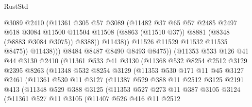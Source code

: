 \begin{lexlean}{RustStd}
\begin{coremodule}
                          @3089
                          @2410
                          (@11361
                            @305
                            @57
                            @3089
                            (@11482
                              @37
                              @65
                              @57
                              @2485
                              @2497
                              @618
                              @3084
                              @11500
                              @11504
                              @11508
                              (@8863 (@11510 @37))
                              @8881
                              (@8348 (@8883 @3084 @3075))
                              @8388))
                          @11438))
                      @11526
                      @11529
                      @11532
                      @11535
                      @8475))
                  @11438)))
            @8484
            @8487
            @8490
            @8493
            @8475))
        (@11353
          @533
          @126
          @41
          @44
          @3130
          @2410
          (@11361
            @533
            @41
            @3130
            (@11368
              @532
              @8254
              @2512
              @3129
              @2395
              @8263
              (@11348
                @532
                @8254
                @3129
                (@11353
                  @530
                  @171
                  @11
                  @45
                  @3127
                  @2461
                  (@11361
                    @530
                    @11
                    @3127
                    (@11387
                      @529
                      @388
                      @11
                      @2512
                      @3125
                      @2191
                      @413
                      (@11348
                        @529
                        @388
                        @3125
                        (@11353
                          @527
                          @273
                          @11
                          @387
                          @3105
                          @3124
                          (@11361
                            @527
                            @11
                            @3105
                            (@11407
                              @526
                              @416
                              @11
                              @2512

\end{coremodule}
\end{lexlean}
